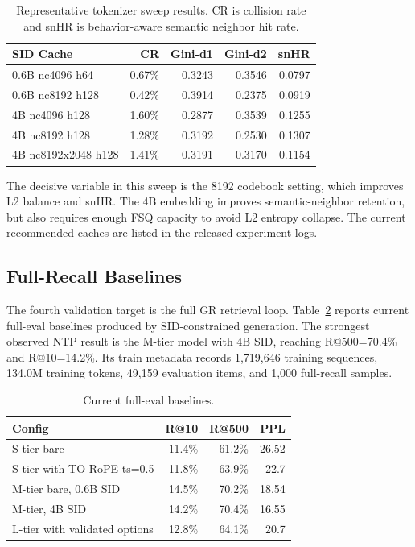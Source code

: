 \documentclass[11pt]{article}
\begin{document}
\begin{table}[t]
\centering
\caption{Representative tokenizer sweep results. CR is collision rate and snHR is behavior-aware semantic neighbor hit rate.}
\label{tab:tokenizer}
\begin{tabular}{lrrrr}
\toprule
SID Cache & CR & Gini-d1 & Gini-d2 & snHR \\
\midrule
0.6B nc4096 h64 & 0.67\% & 0.3243 & 0.3546 & 0.0797 \\
0.6B nc8192 h128 & 0.42\% & 0.3914 & 0.2375 & 0.0919 \\
4B nc4096 h128 & 1.60\% & 0.2877 & 0.3539 & 0.1255 \\
4B nc8192 h128 & 1.28\% & 0.3192 & 0.2530 & 0.1307 \\
4B nc8192x2048 h128 & 1.41\% & 0.3191 & 0.3170 & 0.1154 \\
\bottomrule
\end{tabular}
\end{table}

The decisive variable in this sweep is the 8192 codebook setting, which improves L2 balance and snHR. The 4B embedding improves semantic-neighbor retention, but also requires enough FSQ capacity to avoid L2 entropy collapse. The current recommended caches are listed in the released experiment logs.

\subsection{Full-Recall Baselines}

The fourth validation target is the full GR retrieval loop. Table~\ref{tab:full-eval} reports current full-eval baselines produced by SID-constrained generation. The strongest observed NTP result is the M-tier model with 4B SID, reaching R@500=70.4\% and R@10=14.2\%. Its train metadata records 1,719,646 training sequences, 134.0M training tokens, 49,159 evaluation items, and 1,000 full-recall samples.

\begin{table}[t]
\centering
\caption{Current full-eval baselines.}
\label{tab:full-eval}
\begin{tabular}{lrrr}
\toprule
Config & R@10 & R@500 & PPL \\
\midrule
S-tier bare & 11.4\% & 61.2\% & 26.52 \\
S-tier with TO-RoPE ts=0.5 & 11.8\% & 63.9\% & 22.7 \\
M-tier bare, 0.6B SID & 14.5\% & 70.2\% & 18.54 \\
M-tier, 4B SID & 14.2\% & 70.4\% & 16.55 \\
L-tier with validated options & 12.8\% & 64.1\% & 20.7 \\
\bottomrule
\end{tabular}
\end{table}
\end{document}
